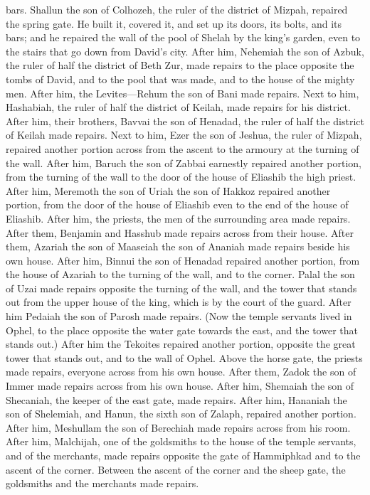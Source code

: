 bars.  Shallun the son of Colhozeh, the ruler of the
district of Mizpah, repaired the spring gate. He built it, covered it,
and set up its doors, its bolts, and its bars; and he repaired the wall
of the pool of Shelah by the king's garden, even to the stairs that go
down from David's city.  After him, Nehemiah the son of
Azbuk, the ruler of half the district of Beth Zur, made repairs to the
place opposite the tombs of David, and to the pool that was made, and to
the house of the mighty men.  After him, the
Levites---Rehum the son of Bani made repairs. Next to him, Hashabiah,
the ruler of half the district of Keilah, made repairs for his district.
 After him, their brothers, Bavvai the son of Henadad,
the ruler of half the district of Keilah made repairs. 
Next to him, Ezer the son of Jeshua, the ruler of Mizpah, repaired
another portion across from the ascent to the armoury at the turning of
the wall.  After him, Baruch the son of Zabbai earnestly
repaired another portion, from the turning of the wall to the door of
the house of Eliashib the high priest.  After him,
Meremoth the son of Uriah the son of Hakkoz repaired another portion,
from the door of the house of Eliashib even to the end of the house of
Eliashib.  After him, the priests, the men of the
surrounding area made repairs.  After them, Benjamin and
Hasshub made repairs across from their house. After them, Azariah the
son of Maaseiah the son of Ananiah made repairs beside his own house.
 After him, Binnui the son of Henadad repaired another
portion, from the house of Azariah to the turning of the wall, and to
the corner.  Palal the son of Uzai made repairs opposite
the turning of the wall, and the tower that stands out from the upper
house of the king, which is by the court of the guard. After him Pedaiah
the son of Parosh made repairs.  (Now the temple servants
lived in Ophel, to the place opposite the water gate towards the east,
and the tower that stands out.)  After him the Tekoites
repaired another portion, opposite the great tower that stands out, and
to the wall of Ophel.  Above the horse gate, the priests
made repairs, everyone across from his own house.  After
them, Zadok the son of Immer made repairs across from his own house.
After him, Shemaiah the son of Shecaniah, the keeper of the east gate,
made repairs.  After him, Hananiah the son of Shelemiah,
and Hanun, the sixth son of Zalaph, repaired another portion. After him,
Meshullam the son of Berechiah made repairs across from his room.
 After him, Malchijah, one of the goldsmiths to the house
of the temple servants, and of the merchants, made repairs opposite the
gate of Hammiphkad and to the ascent of the corner. 
Between the ascent of the corner and the sheep gate, the goldsmiths and
the merchants made repairs.

